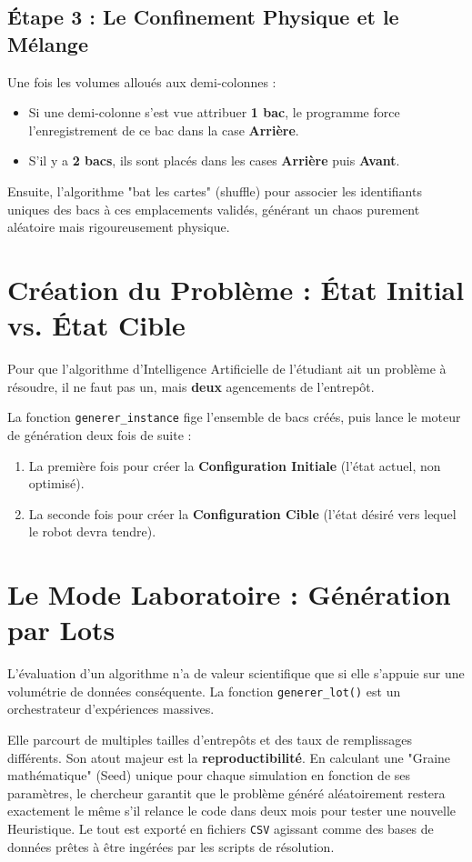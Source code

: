 \documentclass[12pt,a4paper]{article}
\begin{document}
\subsection{Étape 3 : Le Confinement Physique et le Mélange}
Une fois les volumes alloués aux demi-colonnes :
\begin{itemize}
    \item Si une demi-colonne s'est vue attribuer \textbf{1 bac}, le programme force l'enregistrement de ce bac dans la case \textbf{Arrière}.
    \item S'il y a \textbf{2 bacs}, ils sont placés dans les cases \textbf{Arrière} puis \textbf{Avant}.
\end{itemize}
Ensuite, l'algorithme "bat les cartes" (shuffle) pour associer les identifiants uniques des bacs à ces emplacements validés, générant un chaos purement aléatoire mais rigoureusement physique.

\section{Création du Problème : État Initial vs. État Cible}
Pour que l'algorithme d'Intelligence Artificielle de l'étudiant ait un problème à résoudre, il ne faut pas un, mais \textbf{deux} agencements de l'entrepôt. 

La fonction \texttt{generer\_instance} fige l'ensemble de bacs créés, puis lance le moteur de génération deux fois de suite :
\begin{enumerate}
    \item La première fois pour créer la \textbf{Configuration Initiale} (l'état actuel, non optimisé).
    \item La seconde fois pour créer la \textbf{Configuration Cible} (l'état désiré vers lequel le robot devra tendre).
\end{enumerate}

\section{Le Mode Laboratoire : Génération par Lots}
L'évaluation d'un algorithme n'a de valeur scientifique que si elle s'appuie sur une volumétrie de données conséquente. La fonction \texttt{generer\_lot()} est un orchestrateur d'expériences massives.

Elle parcourt de multiples tailles d'entrepôts et des taux de remplissages différents. Son atout majeur est la \textbf{reproductibilité}. En calculant une "Graine mathématique" (Seed) unique pour chaque simulation en fonction de ses paramètres, le chercheur garantit que le problème généré aléatoirement restera exactement le même s'il relance le code dans deux mois pour tester une nouvelle Heuristique. 
Le tout est exporté en fichiers \texttt{CSV} agissant comme des bases de données prêtes à être ingérées par les scripts de résolution.
\end{document}

